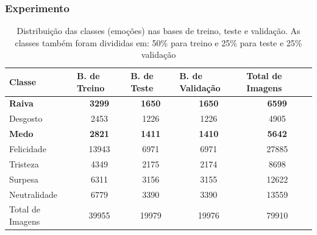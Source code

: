 \documentclass{beamer}
\begin{document}
\begin{frame}
\frametitle{Experimento}
\begin{table}[]
\tiny
\centering
\caption{Distribuição das classes (emoções) nas bases de treino, teste e validação. As classes também foram divididas em: 50\% para treino e 25\% para teste e 25\% validação}
\label{table:distclasse}
\begin{tabular}{lcccc}
\hline
\textbf{Classe}  & \multicolumn{1}{l}{\textbf{B. de Treino}} & \multicolumn{1}{l}{\textbf{B. de Teste}} & \multicolumn{1}{l}{\textbf{B. de Validação}} & \multicolumn{1}{l}{\textbf{Total de Imagens}} \\ \hline
\scriptsize \textbf{Raiva}            & \scriptsize \textbf{3299}                                        & \scriptsize \textbf{1650}                                       & \scriptsize \textbf{1650}                                           & \scriptsize \textbf{6599}                                          \\
\scriptsize Desgosto         & \scriptsize 2453                                        & \scriptsize 1226                                       & \scriptsize 1226                                           & \scriptsize 4905                                          \\
\scriptsize \textbf{Medo}             & \scriptsize \textbf{2821}                                        & \scriptsize \textbf{1411}                                       & \scriptsize \textbf{1410}                                           & \scriptsize \textbf{5642}                                          \\
Felicidade       & 13943                                       & 6971                                       & 6971                                           & 27885                                         \\
Tristeza         & 4349                                        & 2175                                       & 2174                                           & 8698                                          \\
Surpesa          & 6311                                        & 3156                                       & 3155                                           & 12622                                         \\
Neutralidade     & 6779                                        & 3390                                       & 3390                                           & 13559                                         \\
Total de Imagens & 39955                                       & 19979                                      & 19976                                          & 79910                                         \\ \hline
\end{tabular}
\end{table}
\end{frame}
\end{document}
